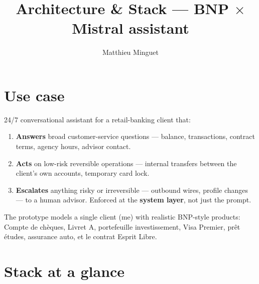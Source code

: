 \documentclass[11pt]{article}
\title{Architecture \& Stack --- BNP $\times$ Mistral assistant}
\author{Matthieu Minguet}
\date{}
\begin{document}
\maketitle

\section{Use case}

24/7 conversational assistant for a retail-banking client that:

\begin{enumerate}[leftmargin=*]
  \item \textbf{Answers} broad customer-service questions --- balance, transactions, contract terms, agency hours, advisor contact.
  \item \textbf{Acts} on low-risk reversible operations --- internal transfers between the client's own accounts, temporary card lock.
  \item \textbf{Escalates} anything risky or irreversible --- outbound wires, profile changes --- to a human advisor. Enforced at the \textbf{system layer}, not just the prompt.
\end{enumerate}

The prototype models a single client (me) with realistic BNP-style products: Compte de chèques, Livret A, portefeuille investissement, Visa Premier, prêt études, assurance auto, et le contrat Esprit Libre.

\pagebreak
\section{Stack at a glance}
\end{document}
